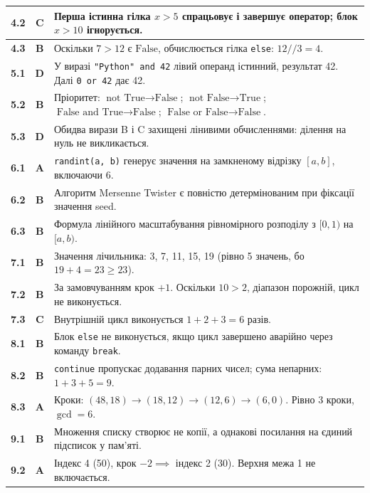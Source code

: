 \begin{longtable}{|c|c|p{11.5cm}|}
	\textbf{4.2} & \textbf{C} & Перша істинна гілка $x > 5$ спрацьовує і завершує оператор; блок $x > 10$ ігнорується. \\ \hline
	\textbf{4.3} & \textbf{B} & Оскільки $7 > 12$ є $\text{False}$, обчислюється гілка \texttt{else}: $12 // 3 = 4$. \\ \hline
	\textbf{5.1} & \textbf{D} & У виразі \texttt{"Python" and 42} лівий операнд істинний, результат 42. Далі \texttt{0 or 42} дає 42. \\ \hline
	\textbf{5.2} & \textbf{B} & Пріоритет: $\text{not True} \to \text{False}$; $\text{not False} \to \text{True}$; $\text{False and True} \to \text{False}$; $\text{False or False} \to \text{False}$. \\ \hline
	\textbf{5.3} & \textbf{D} & Обидва вирази B і C захищені лінивими обчисленнями: ділення на нуль не викликається. \\ \hline
	\textbf{6.1} & \textbf{A} & \texttt{randint(a, b)} генерує значення на замкненому відрізку $[a, b]$, включаючи 6. \\ \hline
	\textbf{6.2} & \textbf{B} & Алгоритм Mersenne Twister є повністю детермінованим при фіксації значення seed. \\ \hline
	\textbf{6.3} & \textbf{B} & Формула лінійного масштабування рівномірного розподілу з $[0, 1)$ на $[a, b)$. \\ \hline
	\textbf{7.1} & \textbf{B} & Значення лічильника: 3, 7, 11, 15, 19 (рівно 5 значень, бо $19 + 4 = 23 \ge 23$). \\ \hline
	\textbf{7.2} & \textbf{B} & За замовчуванням крок $+1$. Оскільки $10 > 2$, діапазон порожній, цикл не виконується. \\ \hline
	\textbf{7.3} & \textbf{C} & Внутрішній цикл виконується $1 + 2 + 3 = 6$ разів. \\ \hline
	\textbf{8.1} & \textbf{B} & Блок \texttt{else} не виконується, якщо цикл завершено аварійно через команду \texttt{break}. \\ \hline
	\textbf{8.2} & \textbf{B} & \texttt{continue} пропускає додавання парних чисел; сума непарних: $1 + 3 + 5 = 9$. \\ \hline
	\textbf{8.3} & \textbf{A} & Кроки: $(48, 18) \to (18, 12) \to (12, 6) \to (6, 0)$. Рівно 3 кроки, $\gcd = 6$. \\ \hline
	\textbf{9.1} & \textbf{B} & Множення списку створює не копії, а однакові посилання на єдиний підсписок у пам'яті. \\ \hline
	\textbf{9.2} & \textbf{A} & Індекс 4 (50), крок $-2 \implies$ індекс 2 (30). Верхня межа 1 не включається. \\ \hline

\end{longtable}
